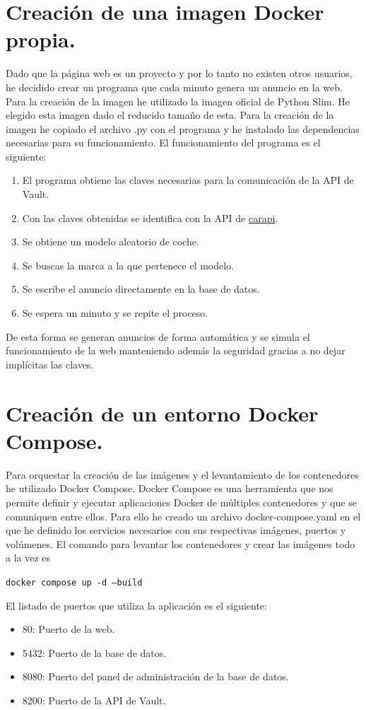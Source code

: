 \documentclass{report}
\begin{document}
        \section{Creación de una imagen Docker propia.} 
            Dado que la página web es un proyecto y por lo tanto no existen otros usuarios, he decidido crear un programa que cada minuto genera un anuncio en la web.
            Para la creación de la imagen he utilizado la imagen oficial de Python Slim.
            He elegido esta imagen dado el reducido tamaño de esta.
            Para la creación de la imagen he copiado el archivo .py con el programa y he instalado las dependencias necesarias para su funcionamiento.
            El funcionamiento del programa es el siguiente:
            \begin{enumerate}
                \item El programa obtiene las claves necesarias para la comunicación de la API de Vault.
                \item Con las claves obtenidas se identifica con la API de \href{https://carapi.app/api#/}{carapi}.
                \item Se obtiene un modelo aleatorio de coche.
                \item Se buscas la marca a la que pertenece el modelo.
                \item Se escribe el anuncio directamente en la base de datos.
                \item Se espera un minuto y se repite el proceso.
            \end{enumerate}
            De esta forma se generan anuncios de forma automática y se simula el funcionamiento de la web manteniendo además la seguridad gracias a no dejar implícitas las claves.
        \clearpage
        \section{Creación de un entorno Docker Compose.}
            Para orquestar la creación de las imágenes y el levantamiento de los contenedores he utilizado Docker Compose.
            Docker Compose es una herramienta que nos permite definir y ejecutar aplicaciones Docker de múltiples contenedores y que se comuniquen entre ellos.
            Para ello he creado un archivo docker-compose.yaml en el que he definido los servicios necesarios con sus respectivas imágenes, puertos y volúmenes.
            El comando para levantar los contenedores y crear las imágenes todo a la vez es
            \begin{center}
                \texttt{docker compose up -d --build}
            \end{center}
            El listado de puertos que utiliza la aplicación es el siguiente:
            \begin{itemize}
                \item 80: Puerto de la web.
                \item 5432: Puerto de la base de datos.
                \item 8080: Puerto del panel de administración de la base de datos.
                \item 8200: Puerto de la API de Vault.
            \end{itemize}
        \clearpage
\end{document}

